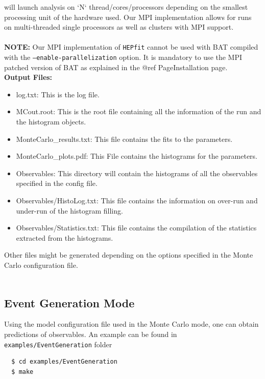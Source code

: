 \documentclass[preprint,3p,12pt]{elsarticle}
\newcommand{\HEPfit}{\texttt{HEPfit}\xspace}
\begin{document}
will launch analysis on `N` thread/cores/processors depending on the smallest
processing unit of the hardware used. Our MPI implementation allows for runs on multi-threaded single processors as
well as clusters with MPI support.\\\\
%
{\bf NOTE:} Our MPI implementation of \HEPfit cannot be used with
BAT compiled with the \texttt{--enable-parallelization} option. It is
mandatory to use the MPI patched version of BAT as explained in the @ref PageInstallation page.\\


{\bf Output Files:}
\begin{itemize}
\item log.txt: This is the log file.
\item MCout.root: This is the root file containing all the information of the run and
  the histogram objects.
\item MonteCarlo\_results.txt: This file contains the fits to the parameters.
\item MonteCarlo\_plots.pdf: This File contains the histograms for the parameters.
\item Observables: This directory will contain the histograms of all the observables
  specified in the config file.
\item Observables/HistoLog.txt: This file contains the information on over-run and under-run
  of the histogram filling.
\item Observables/Statistics.txt: This file contains the compilation of the statistics
  extracted from the histograms.
\end{itemize}
Other files might be generated depending on the options specified in the Monte Carlo 
configuration file.\\\\
%
\subsection{Event Generation Mode}
\label{sec:MC}
Using the model configuration file used in the Monte Carlo mode, one
can obtain predictions of observables. An example can be found in \texttt{examples/EventGeneration} folder

\begin{lstlisting}
  $ cd examples/EventGeneration
  $ make
\end{lstlisting}
\end{document}
